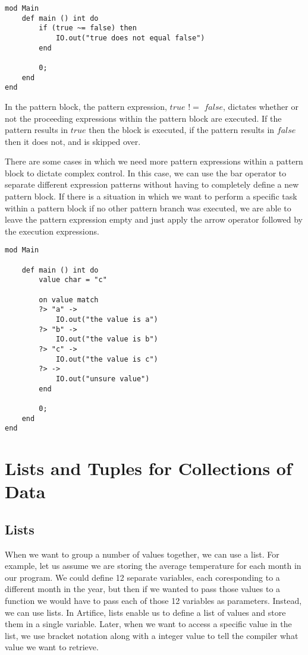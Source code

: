 \documentclass{article}
\begin{document}
\begin{lstlisting}
mod Main
	def main () int do
		if (true ~= false) then
			IO.out("true does not equal false")
		end
	
		0;
	end
end
\end{lstlisting}

In the pattern block, the pattern expression, $true$ $!=$ $false$, dictates whether or not the proceeding expressions within the pattern block are executed. If the pattern
results in $true$ then the block is executed, if the pattern results in $false$ then it does not, and is skipped over.

There are some cases in which we need more pattern expressions within a pattern block to dictate complex control. In this case, we can use the bar operator to separate different
expression patterns without having to completely define a new pattern block. If there is a situation in which we want to perform a specific task within a pattern block if no other
pattern branch was executed, we are able to leave the pattern expression empty and just apply the arrow operator followed by the execution expressions.

\begin{lstlisting}
mod Main

	def main () int do
		value char = "c"

		on value match
		?> "a" ->
			IO.out("the value is a")
		?> "b" ->
			IO.out("the value is b")
		?> "c" ->
			IO.out("the value is c")
		?> ->
			IO.out("unsure value")
		end

		0;
	end
end
\end{lstlisting}


\section{Lists and Tuples for Collections of Data}

\subsection{Lists}

When we want to group a number of values together, we can use a list. For example, let us assume we are storing the average temperature for each month in our program.
We could define 12 separate variables, each coresponding to a different month in the year, but then if we wanted to pass those values to a function we would have to pass
each of those 12 variables as parameters. Instead, we can use lists. In Artifice, lists enable us to define a list of values and store them in a single variable.
Later, when we want to access a specific value in the list, we use bracket notation along with a integer value to tell the compiler what value we want to retrieve.
\end{document}
